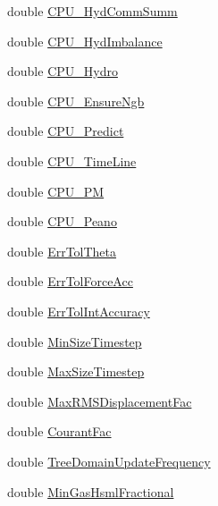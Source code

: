 \begin{DoxyCompactItemize}
\item 
double \hyperlink{structglobal__data__all__processes_ad03842fb23d3c15316ca07c7ac1bce27}{CPU\_\-HydCommSumm}
\item 
double \hyperlink{structglobal__data__all__processes_a848f914dfb3ae24d6faedc1944bcb265}{CPU\_\-HydImbalance}
\item 
double \hyperlink{structglobal__data__all__processes_add20a8e70f3c4cc7912dc81ef141daa2}{CPU\_\-Hydro}
\item 
double \hyperlink{structglobal__data__all__processes_ad3447593858d4165b669b5e70b2521cd}{CPU\_\-EnsureNgb}
\item 
double \hyperlink{structglobal__data__all__processes_afb9d30620ea0dc8b9e46000e3ce0b3e3}{CPU\_\-Predict}
\item 
double \hyperlink{structglobal__data__all__processes_a675f7230ece5f6d88fcc0384a8e1f6c9}{CPU\_\-TimeLine}
\item 
double \hyperlink{structglobal__data__all__processes_a2251bf94479cb20a7af9c34ed56587d1}{CPU\_\-PM}
\item 
double \hyperlink{structglobal__data__all__processes_a3d1492ec738b3ebf2025de1d2f398b7d}{CPU\_\-Peano}
\item 
double \hyperlink{structglobal__data__all__processes_ac3edc89fa5616655618ddccb430e3dfe}{ErrTolTheta}
\item 
double \hyperlink{structglobal__data__all__processes_a5a8eb914026679a7c816a09c20d25de0}{ErrTolForceAcc}
\item 
double \hyperlink{structglobal__data__all__processes_a73f3a95e03513c038cf3215a2204bce4}{ErrTolIntAccuracy}
\item 
double \hyperlink{structglobal__data__all__processes_ab5f56d94a4417c5a703b6d2d4cb81a05}{MinSizeTimestep}
\item 
double \hyperlink{structglobal__data__all__processes_a7303c9f6c34ee3befcac84043c8ec3ea}{MaxSizeTimestep}
\item 
double \hyperlink{structglobal__data__all__processes_a988ecf1fcfe5e61ff9ac29792c816c24}{MaxRMSDisplacementFac}
\item 
double \hyperlink{structglobal__data__all__processes_aa4cf405da4e0a6fc588f5a5ba7e8fde8}{CourantFac}
\item 
double \hyperlink{structglobal__data__all__processes_a31f122fafb06e13f611ff905f514bfa9}{TreeDomainUpdateFrequency}
\item 
double \hyperlink{structglobal__data__all__processes_acddf5d973c6847405b85f4531d5b7510}{MinGasHsmlFractional}
\item 

\end{DoxyCompactItemize}
